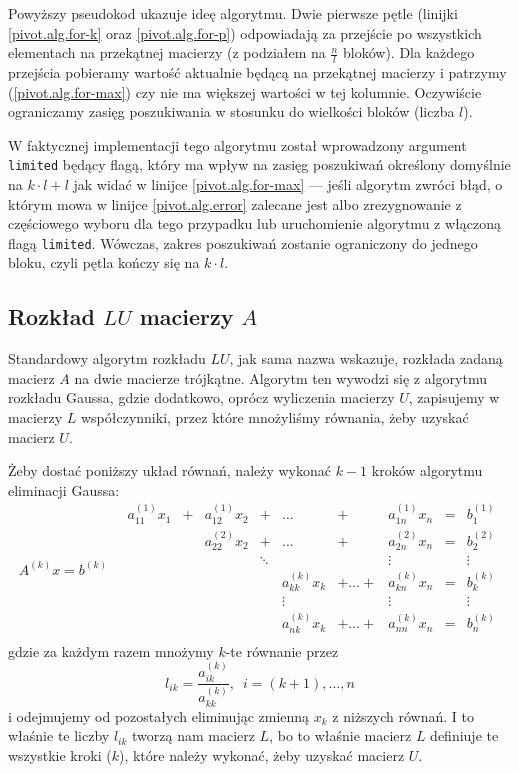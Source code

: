 \documentclass[10pt]{article}
\begin{document}
Powyższy pseudokod ukazuje ideę algorytmu. Dwie pierwsze pętle (linijki \ref*{pivot.alg.for-k} oraz \ref*{pivot.alg.for-p}) odpowiadają za przejście po wszystkich elementach na przekątnej macierzy (z podziałem na $\frac{n}{l}$ bloków). Dla każdego przejścia pobieramy wartość aktualnie będącą na przekątnej macierzy i patrzymy (\ref*{pivot.alg.for-max}) czy nie ma większej wartości w tej kolumnie. Oczywiście ograniczamy zasięg poszukiwania w stosunku do wielkości bloków (liczba $l$).

W faktycznej implementacji tego algorytmu został wprowadzony argument \texttt{limited} będący flagą, który ma wpływ na zasięg poszukiwań określony domyślnie na $k \cdot l + l$ jak widać w linijce \ref*{pivot.alg.for-max} — jeśli algorytm zwróci błąd, o którym mowa w linijce \ref*{pivot.alg.error} zalecane jest albo zrezygnowanie z częściowego wyboru dla tego przypadku lub uruchomienie algorytmu z włączoną flagą \texttt{limited}. Wówczas, zakres poszukiwań zostanie ograniczony do jednego bloku, czyli pętla kończy się na $k \cdot l$.

\subsection{Rozkład $LU$ macierzy $A$}

Standardowy algorytm rozkładu $LU$, jak sama nazwa wskazuje, rozkłada zadaną macierz $A$ na dwie macierze trójkątne. Algorytm ten wywodzi się z algorytmu rozkładu Gaussa, gdzie dodatkowo, oprócz wyliczenia macierzy $U$, zapisujemy w macierzy $L$ współczynniki, przez które mnożyliśmy równania, żeby uzyskać macierz $U$.

Żeby dostać poniższy układ równań, należy wykonać $k-1$ kroków algorytmu eliminacji Gaussa:
$$
A^{(k)} x = b^{(k)}
\quad
\begin{matrix}
    a_{11}^{(1)} x_1 &+ & a_{12}^{(1)} x_2 &+ &\dots &+ &a_{1n}^{(1)} x_n &= &b_1^{(1)}\\
    && a_{22}^{(2)} x_2 &+ &\dots &+ &a_{2n}^{(2)} x_n &= &b_2^{(2)}\\
    &&& \ddots &&& \vdots && \vdots\\
    &&&&a_{kk}^{(k)} x_k &+ \dots + &a_{kn}^{(k)} x_n &= &b_k^{(k)}\\
    &&&&\vdots && \vdots && \vdots\\
    &&&& a_{nk}^{(k)} x_k &+ \dots + &a_{nn}^{(k)} x_n &= &b_n^{(k)}\\
\end{matrix}
$$
gdzie za każdym razem mnożymy $k$-te równanie przez
$$
l_{ik} = \frac{a_{ik}^{(k)}}{a_{kk}^{(k)}}, \enspace i = (k+1),\dots,n
$$
i odejmujemy od pozostałych eliminując zmienną $x_k$ z niższych równań.
I to właśnie te liczby $l_{ik}$ tworzą nam macierz $L$, bo to właśnie macierz $L$ definiuje te wszystkie kroki ($k$), które należy wykonać, żeby uzyskać macierz $U$.
\end{document}
